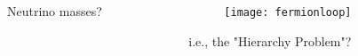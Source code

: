 \documentclass[10pt,aspectratio=169]{beamer}
\begin{document}
\begin{frame}
\begin{columns}[t]
\begin{column}{0.7\textwidth}
\begin{columns}[t]
\begin{column}{0.5\textwidth}
\begin{center}
            Neutrino masses?
          \end{center}
        \end{column}
        \begin{column}{0.5\textwidth}
          \begin{figure}
            \texttt{[image: fermionloop]}
          \end{figure}
          \begin{center}
            \alert{i.e., the "Hierarchy Problem"?}
          \end{center}
        \end{column}
      \end{columns}
    \end{column}
    \end{columns}
\end{frame}
\end{document}
